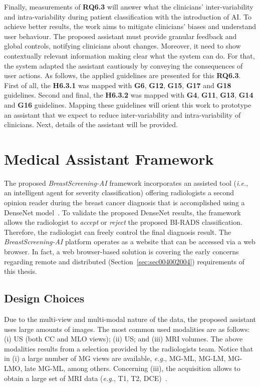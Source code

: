 Finally, measurements of {\bf RQ6.3} will answer what the clinicians' inter-variability and intra-variability during patient classification with the introduction of \ac{AI}.
To achieve better results, the work aims to mitigate clinicians' biases and understand user behaviour.
The proposed assistant must provide granular feedback and global controls, notifying clinicians about changes.
Moreover, it need to show contextually relevant information making clear what the system can do.
For that, the system adapted the assistant cautiously by conveying the consequences of user actions.
As follows, the applied guidelines are presented for this {\bf RQ6.3}.
First of all, the {\bf H6.3.1} was mapped with {\bf G6}, {\bf G12}, {\bf G15}, {\bf G17} and {\bf G18} guidelines.
Second and final, the {\bf H6.3.2} was mapped with {\bf G4}, {\bf G11}, {\bf G13}, {\bf G14} and {\bf G16} guidelines.
Mapping these guidelines will orient this work to prototype an assistant that we expect to reduce inter-variability and intra-variability of clinicians.
Next, details of the assistant will be provided.

\section{Medical Assistant Framework}
\label{sec:sec006004}

The proposed {\it BreastScreening-AI} framework incorporates an assisted tool ({\it i.e.}, an intelligent agent for severity classification) offering radiologists a second opinion reader during the breast cancer diagnosis that is accomplished  using  a DenseNet model~\cite{chen2019learning}.
To validate the proposed DenseNet results, the framework allows the radiologist to {\it accept} or {\it reject} the proposed \ac{BI-RADS} classification.
Therefore, the radiologist can freely control the final diagnosis result.
The {\it BreastScreening-AI} platform operates as a website that can be accessed via a web browser.
In fact, a web browser-based solution is covering the early concerns regarding remote and distributed (Section~\ref{sec:sec004002004}) requirements of this thesis.

\subsection{Design Choices}
\label{sec:sec006004001}

Due to the multi-view and multi-modal nature of the data, the proposed assistant uses large amounts of images.
The most common used modalities are as follows:
(i) \ac{US} (both \ac{CC} and \ac{MLO} views);
(ii) \ac{US}; and
(iii) \ac{MRI} volumes.
The above modalities results from a selection provided by the radiologists team.
Notice that in (i) a large number of \ac{MG} views are available, {\it e.g.}, MG-ML, MG-LM, MG-LMO, late MG-ML, among others.
Concerning (iii), the acquisition allows to obtain a large set of \ac{MRI} data ({\it e.g.}, T1, T2, \ac{DCE})~\cite{seifabadi2019correlation}.

